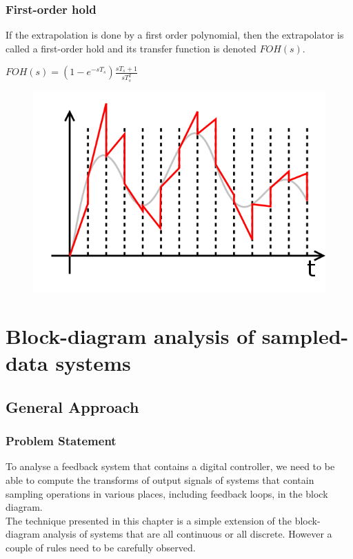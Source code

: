 \begin{frame}
	\frametitle{First-order hold}
	If the extrapolation is done by a first order polynomial, then the extrapolator is called a first-order hold and its transfer function is denoted $FOH(s)$. 
	\begin{center}
		$FOH(s)=(1-e^{-sT_s})\frac{sT_s+1}{sT_s^2}$
	\end{center}
	\vspace{-0.5em}
	\begin{figure}
		\includegraphics[width=0.5\linewidth]{foh}
	\end{figure}
\end{frame}

\section{Block-diagram analysis of sampled-data systems}

\subsection{General Approach}

\begin{frame}
	\frametitle{Problem Statement}
	\justify
	To analyse a feedback system that contains a digital controller, we need to be able to compute the transforms of output signals of systems that contain sampling operations in various places, including feedback loops, in the block diagram.\\
	\vspace{1em}
	The technique presented in this chapter is a simple extension of the block-diagram analysis of systems that are all continuous or all discrete. However a couple of rules need to be carefully observed. 
\end{frame}

